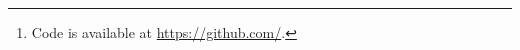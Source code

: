 \begin{abstract}
    abstract goes here.%
    \footnote{Code is available at \url{https://github.com/}.}
\end{abstract}

